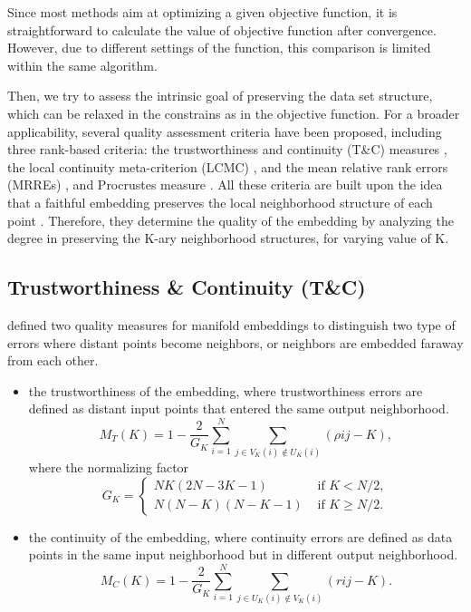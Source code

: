 \documentclass[11pt,a4paper,]{article}
\begin{document}
Since most methods aim at optimizing a given objective function, it is straightforward to calculate the value of objective function after convergence. However, due to different settings of the function, this comparison is limited within the same algorithm.

Then, we try to assess the intrinsic goal of preserving the data set structure, which can be relaxed in the constrains as in the objective function. For a broader applicability, several quality assessment criteria have been proposed, including three rank-based criteria: the trustworthiness and continuity (T\&C) measures \autocite{Venna2006-nd}, the local continuity meta-criterion (LCMC) \autocite{Chen2009-su}, and the mean relative rank errors (MRREs) \autocite{Lee2007-wq}, and Procrustes measure \autocite{Goldberg2009-tb}. All these criteria are built upon the idea that a faithful embedding preserves the local neighborhood structure of each point \autocite*{Goldberg2009-tb}.
Therefore, they determine the quality of the embedding by analyzing the degree in preserving the K-ary neighborhood structures, for varying value of K.

\hypertarget{trustworthiness-continuity-tc}{%
\subsection{Trustworthiness \& Continuity (T\&C)}\label{trustworthiness-continuity-tc}}

\textcite{Venna2006-nd} defined two quality measures for manifold embeddings to distinguish two type of errors where distant points become neighbors, or neighbors are embedded faraway from each other.

\begin{itemize}
\item
  the trustworthiness of the embedding, where trustworthiness errors are defined as distant input points that entered the same output neighborhood.
  \begin{equation}
  \label{trustworthiness}
  M_{T}(K)=1-\frac{2}{G_{K}} \sum_{i=1}^{N} \sum_{j \in V_{K}(i) \notin U_{K}(i)}(\rho{ij}-K),
  \end{equation}
  where the normalizing factor
  \[
  G_{K}=\left\{\begin{array}{ll}
  N K(2 N-3 K-1) & \text { if } K<N / 2, \\
  N(N-K)(N-K-1) & \text { if } K \geqslant N / 2.
  \end{array}\right.
  \]
\item
  the continuity of the embedding, where continuity errors are defined as data points in the same input neighborhood but in different output neighborhood.
  \begin{equation}
  \label{continuity}
  M_{C}(K)=1-\frac{2}{G_{K}} \sum_{i=1}^{N} \sum_{j \in U_{K}(i) \notin V_{K}(i)}(r{ij}-K).
  \end{equation}
\end{itemize}
\end{document}
